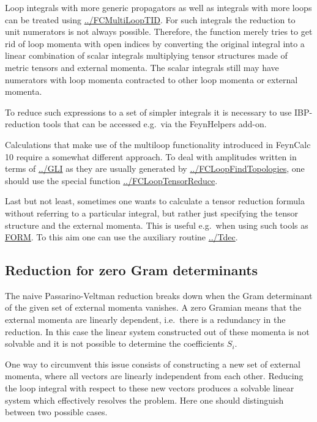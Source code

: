 \documentclass[../FeynCalcManual.tex]{subfiles}
\begin{document}
Loop integrals with more generic propagators as well as integrals with
more loops can be treated using
\hyperlink{../fcmultilooptid}{../FCMultiLoopTID}. For such integrals the
reduction to unit numerators is not always possible. Therefore, the
function merely tries to get rid of loop momenta with open indices by
converting the original integral into a linear combination of scalar
integrals multiplying tensor structures made of metric tensors and
external momenta. The scalar integrals still may have numerators with
loop momenta contracted to other loop momenta or external momenta.

To reduce such expressions to a set of simpler integrals it is necessary
to use IBP-reduction tools that can be accessed e.g.~via the FeynHelpers
add-on.

Calculations that make use of the multiloop functionality introduced in
FeynCalc 10 require a somewhat different approach. To deal with
amplitudes written in terms of \hyperlink{../gli}{../GLI} as they are
usually generated by
\hyperlink{../fcloopfindtopologies}{../FCLoopFindTopologies}, one should
use the special function
\hyperlink{../fclooptensorreduce}{../FCLoopTensorReduce}.

Last but not least, sometimes one wants to calculate a tensor reduction
formula without referring to a particular integral, but rather just
specifying the tensor structure and the external momenta. This is useful
e.g.~when using such tools as
\href{https://github.com/vermaseren/form}{FORM}. To this aim one can use
the auxiliary routine \hyperlink{../tdec}{../Tdec}.

\subsection{Reduction for zero Gram
determinants}\label{reduction-for-zero-gram-determinants}

The naive Passarino-Veltman reduction breaks down when the Gram
determinant of the given set of external momenta vanishes. A zero
Gramian means that the external momenta are linearly dependent,
i.e.~there is a redundancy in the reduction. In this case the linear
system constructed out of these momenta is not solvable and it is not
possible to determine the coefficients \(S_i\).

One way to circumvent this issue consists of constructing a new set of
external momenta, where all vectors are linearly independent from each
other. Reducing the loop integral with respect to these new vectors
produces a solvable linear system which effectively resolves the
problem. Here one should distinguish between two possible cases.
\end{document}
